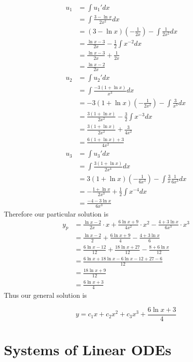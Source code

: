 \documentclass[openany]{report}
\begin{document}
\begin{align*}
    u_1 &= \int u_1'dx\\
    &= \int \frac{3-\ln x}{2x^2}dx\\
    &= (3-\ln x)\left(-\frac{1}{2x}\right) - \int \frac{1}{2x^2}dx\\
    &= \frac{\ln x - 3}{2x} - \frac{1}{2}\int x^{-2}dx\\
    &= \frac{\ln x - 3}{2x} + \frac{1}{2x}\\
    &= \frac{\ln x - 2}{2x}\\
    u_2 &= \int u_2'dx\\
    &= \int \frac{-3(1+\ln x)}{x^3}dx\\
    &= -3(1+\ln x)\left(-\frac{1}{2x^2}\right) - \int \frac{3}{x^3}dx\\
    &= \frac{3(1+\ln x)}{2x^2} - \frac{3}{2}\int x^{-3}dx\\
    &= \frac{3(1+ \ln x)}{2x^2} + \frac{3}{4x^2}\\
    &= \frac{6 (1 + \ln x) + 3 }{4x^2}\\
    u_3 &= \int u_3'dx\\
    &= \int \frac{3(1+\ln x)}{2x^4}dx\\
    &= 3(1 + \ln x) \left(-\frac{1}{6x^3}\right) - \int \frac{3}{x}\frac{1}{6x^3}dx\\
    &= -\frac{1 + \ln x}{2x^3} + \frac{1}{2}\int x^{-4}dx\\
    &= \frac{-4-3\ln x}{6x^3}
\end{align*}
Therefore our particular solution is
\begin{align*}
    y_p &= \frac{\ln x - 2}{2x} \cdot x + \frac{6\ln x + 9}{4x^2} \cdot x^2 - \frac{4 + 3 \ln x}{6x^3}\cdot x^3\\
    &= \frac{\ln x - 2}{2} + \frac{6\ln x + 9}{4} - \frac{4 + 3 \ln x}{6}\\
    &= \frac{6\ln x - 12}{12} + \frac{18\ln x + 27}{12} - \frac{8 + 6 \ln x}{12}\\
    &= \frac{6\ln x + 18 \ln x - 6 \ln x - 12 + 27 - 6}{12}\\
    &= \frac{18\ln x + 9}{12}\\
    &= \frac{6\ln x + 3}{4}
\end{align*}
Thus our general solution is 

\[y = c_1x + c_2x^2 + c_3x^3 + \frac{6\ln x + 3}{4}\]

\chapter{Systems of Linear ODEs}
\end{document}
